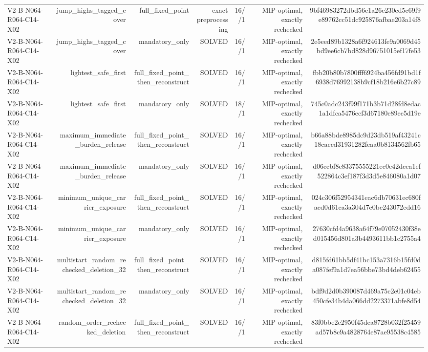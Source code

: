 {\begin{longtable}{lrrrrrr}
V2-B-N064-R064-C14-X02 & jump\_highs\_tagged\_cover & full\_fixed\_point & exact preprocessing & 16//1 & MIP-optimal, exactly rechecked & 9bf46983272dbd56c1a26e230ed5c69f9e89762cc51dc925876afbae203a14f8 \\
V2-B-N064-R064-C14-X02 & jump\_highs\_tagged\_cover & mandatory\_only & SOLVED & 16//1 & MIP-optimal, exactly rechecked & 2e5eed89b1328a6f924613fe9a0069d45bd9ee6cb7bd828d96751015ef17fe53 \\
V2-B-N064-R064-C14-X02 & lightest\_safe\_first & full\_fixed\_point\_then\_reconstruct & SOLVED & 16//1 & MIP-optimal, exactly rechecked & fbb20b80b7800fff6924ba456fd91bd1f6938d76992138b9cf18b216e6b27c89 \\
V2-B-N064-R064-C14-X02 & lightest\_safe\_first & mandatory\_only & SOLVED & 18//1 & MIP-optimal, exactly rechecked & 745c0adc243f99f171b3b71d28fd8edac1a1dfca5476ecf3d67180e89ec5d19e \\
V2-B-N064-R064-C14-X02 & maximum\_immediate\_burden\_release & full\_fixed\_point\_then\_reconstruct & SOLVED & 16//1 & MIP-optimal, exactly rechecked & b66a88bde8985dc9d23db519af43241c18caccd31931282feaa0b8134562fb65 \\
V2-B-N064-R064-C14-X02 & maximum\_immediate\_burden\_release & mandatory\_only & SOLVED & 16//1 & MIP-optimal, exactly rechecked & d06ccbf8e83375555221ec0e42dcea1ef522864c3ef187f3d3d5e846080a1d07 \\
V2-B-N064-R064-C14-X02 & minimum\_unique\_carrier\_exposure & full\_fixed\_point\_then\_reconstruct & SOLVED & 16//1 & MIP-optimal, exactly rechecked & 024c306f52954341eac6db70631ec680facd0d61ca3a304d7e0be243072edd16 \\
V2-B-N064-R064-C14-X02 & minimum\_unique\_carrier\_exposure & mandatory\_only & SOLVED & 16//1 & MIP-optimal, exactly rechecked & 27630cfd4a9638a64f79e07052430f38ed015456d801a3b4493611bb1c2755a4 \\
V2-B-N064-R064-C14-X02 & multistart\_random\_rechecked\_deletion\_32 & full\_fixed\_point\_then\_reconstruct & SOLVED & 16//1 & MIP-optimal, exactly rechecked & d815fd61bb5df41bc153a7316b15fd0da087fef9a1d7ea56bbe73bd4deb62455 \\
V2-B-N064-R064-C14-X02 & multistart\_random\_rechecked\_deletion\_32 & mandatory\_only & SOLVED & 16//1 & MIP-optimal, exactly rechecked & bdf9d2d0b390087d469a75c2e01c04eb450cfe34b4da066dd2273371abfe8d54 \\
V2-B-N064-R064-C14-X02 & random\_order\_rechecked\_deletion & full\_fixed\_point\_then\_reconstruct & SOLVED & 16//1 & MIP-optimal, exactly rechecked & 83f0bbe2e2950f45dea8728b032f25459ad57b8c9a4828764e87ae95538c4585 \\

\end{longtable}}
